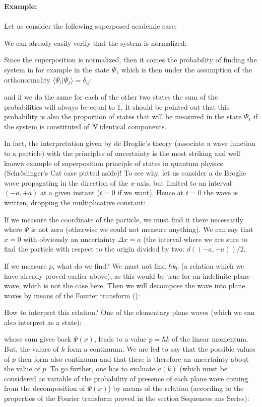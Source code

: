 	\begin{tcolorbox}[colframe=black,colback=white,sharp corners]
	\textbf{{\Large {}}Example:}\\\\
	Let us consider the following superposed academic case:
	
	We can already easily verify that the system is normalized:
	
	Since the superposition is normalized, then it comes the probability of finding the system in for example in the state $\Psi_1$ which is then under the assumption of the orthonormality $\langle \Psi_i|\Psi_j \rangle=\delta_{ij}$:
	
	and if we do the same for each of the other two states the sum of the probabilities will always be equal to $1$. It should be pointed out that this probability is also the proportion of states that will be measured in the state $\Psi_1$ if the system is constituted of $N$ identical components.
	\end{tcolorbox}
	In fact, the interpretation given by de Broglie's theory (associate a wave function to a particle) with the principles of uncertainty is the most striking and well known example of superposition principle of states in quantum physics (Schrödinger's Cat case putted aside)! To see why, let us consider a de Broglie wave propagating in the direction of the $x$-axis, but limited to an interval $(-a,+a)$ at a given instant ($t=0$ if we want). Hence at $t=0$ the wave is written, dropping the multiplicative constant:
	
	If we measure the coordinate of the particle, we must find it there necessarily where $\Psi$ is not zero (otherwise we could not measure anything). We can say that $x=0$ with obviously an uncertainty $\Delta x=a$ (the interval where we are sure to find the particle with respect to the origin divided by two: $d((-a,+a))/2$.
	
	If we measure $p$, what do we find? We must not find $\hbar k_0$ (a relation which we have already proved earlier above), as this would be true for an indefinite plane wave, which is not the case here. Then we will decompose the wave into plane waves by means of the Fourier transform ():
	
	How to interpret this relation? One of the elementary plane waves (which we can also interpret as a state):
	
	whose sum gives back $\Psi(x)$, leads to a value $p=\hbar k$ of the linear momentum. But, the values of $k$ form a continuum. We are led to say that the possible values of $p$ then form also continuum and that there is therefore an uncertainty about the value of $p$. To go further, one has to evaluate $a(k)$ (which must be considered as variable of the probability of presence of each plane wave coming from the decomposition of $\Psi(x)$) by means of the relation (according to the properties of the Fourier transform proved in the section Sequences ans Series):
	
